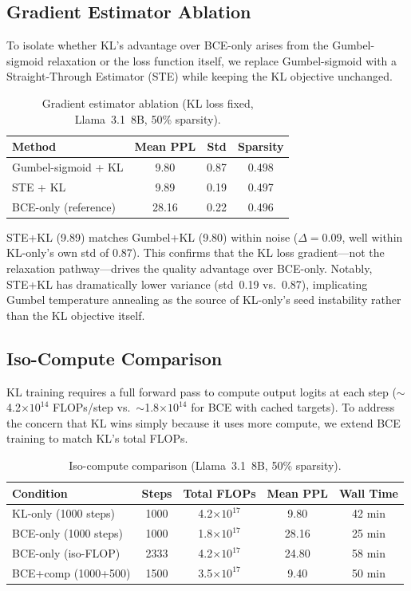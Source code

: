 \documentclass[11pt]{article}
\begin{document}
\subsection{Gradient Estimator Ablation}

To isolate whether KL's advantage over BCE-only arises from the Gumbel-sigmoid relaxation or the loss function itself, we replace Gumbel-sigmoid with a Straight-Through Estimator (STE) while keeping the KL objective unchanged.

\begin{table}[h]
\centering
\caption{Gradient estimator ablation (KL loss fixed, Llama~3.1~8B, 50\% sparsity).}
\label{tab:ste}
\small
\begin{tabular}{lccc}
\toprule
Method & Mean PPL & Std & Sparsity \\
\midrule
Gumbel-sigmoid + KL & 9.80 & 0.87 & 0.498 \\
STE + KL & 9.89 & 0.19 & 0.497 \\
BCE-only (reference) & 28.16 & 0.22 & 0.496 \\
\bottomrule
\end{tabular}
\end{table}

STE+KL (9.89) matches Gumbel+KL (9.80) within noise ($\Delta = 0.09$, well within KL-only's own std of 0.87).
This confirms that the KL loss gradient---not the relaxation pathway---drives the quality advantage over BCE-only.
Notably, STE+KL has dramatically lower variance (std~0.19 vs.~0.87), implicating Gumbel temperature annealing as the source of KL-only's seed instability rather than the KL objective itself.

\subsection{Iso-Compute Comparison}

KL training requires a full forward pass to compute output logits at each step ($\sim$4.2$\times 10^{14}$ FLOPs/step vs.\ $\sim$1.8$\times 10^{14}$ for BCE with cached targets).
To address the concern that KL wins simply because it uses more compute, we extend BCE training to match KL's total FLOPs.

\begin{table}[h]
\centering
\caption{Iso-compute comparison (Llama~3.1~8B, 50\% sparsity).}
\label{tab:iso_compute}
\small
\begin{tabular}{lcccc}
\toprule
Condition & Steps & Total FLOPs & Mean PPL & Wall Time \\
\midrule
KL-only (1000 steps) & 1000 & 4.2$\times 10^{17}$ & 9.80 & 42 min \\
BCE-only (1000 steps) & 1000 & 1.8$\times 10^{17}$ & 28.16 & 25 min \\
BCE-only (iso-FLOP) & 2333 & 4.2$\times 10^{17}$ & 24.80 & 58 min \\
BCE+comp (1000+500) & 1500 & 3.5$\times 10^{17}$ & 9.40 & 50 min \\
\bottomrule
\end{tabular}
\end{table}
\end{document}
